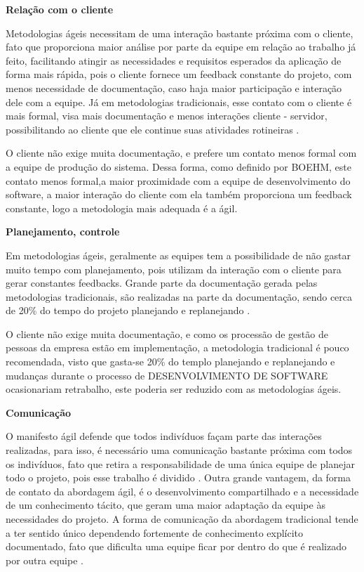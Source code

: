 \begin{description}
\item \textbf{Relação com o cliente}

Metodologias ágeis necessitam de uma interação bastante próxima com o cliente, fato que proporciona maior análise por parte da equipe em relação ao trabalho já feito, facilitando atingir as necessidades e requisitos esperados da aplicação de forma mais rápida, pois o cliente fornece um feedback constante do projeto, com menos necessidade de documentação, caso haja maior participação e interação dele com a equipe. Já em metodologias tradicionais, esse contato com o cliente é mais formal, visa mais documentação e menos interações cliente - servidor, possibilitando ao cliente que ele continue suas atividades rotineiras \cite{boehm2004}.

O cliente não exige muita documentação, e prefere um contato menos formal com a equipe de produção do sistema. Dessa forma, como definido por BOEHM, este contato menos formal,a maior proximidade com a equipe de desenvolvimento do software, a maior interação do cliente com ela também proporciona um feedback constante, logo a metodologia mais adequada é a ágil.

\item \textbf{Planejamento, controle}

Em metodologias ágeis, geralmente as equipes tem a possibilidade de não gastar muito tempo com planejamento, pois utilizam da interação com o cliente para gerar constantes feedbacks. Grande parte da documentação gerada pelas metodologias tradicionais, são realizadas na parte da documentação, sendo cerca de 20\% do tempo do projeto planejando e replanejando \cite{boehm2004}.

O cliente não exige muita documentação, e como os processão de gestão de pessoas da empresa estão em implementação, a metodologia tradicional é pouco recomendada, visto que gasta-se 20\% do templo planejando e replanejando e mudanças durante o processo de DESENVOLVIMENTO DE SOFTWARE ocasionariam retrabalho, este poderia ser reduzido com as metodologias ágeis.

\item \textbf{Comunicação}

O manifesto ágil defende que todos indivíduos façam parte das interações realizadas, para isso, é necessário uma comunicação bastante próxima com todos os indivíduos, fato que retira a responsabilidade de uma única equipe de planejar todo o projeto, pois esse trabalho é dividido \cite{agileManifest}. Outra grande vantagem, da forma de contato da abordagem ágil, é o desenvolvimento compartilhado e a necessidade de um conhecimento tácito, que geram uma maior adaptação da equipe às necessidades do projeto. A forma de comunicação da abordagem tradicional tende a ter sentido único dependendo fortemente de conhecimento explícito documentado, fato que dificulta uma equipe ficar por dentro do que é realizado por outra equipe \cite{boehm2004}.


\end{description}
